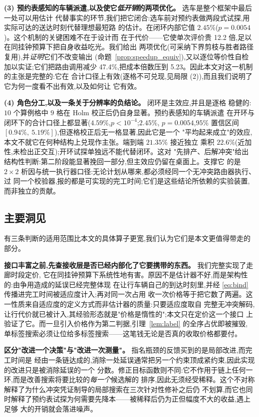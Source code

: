 \documentclass[manuscript,screen,review]{acmart}
\newcommand{\NCases}{10}
\newcommand{\GainProbeOpen}{4.59\%}      %
\newcommand{\PProbeOpen}{<10^{-4}}
\newcommand{\GainProbeLoop}{2.45\%}      %
\newcommand{\PProbeLoop}{=0.0054}
\newcommand{\GainEndToEnd}{21.35\%}      %
\newcommand{\CIProbeLoop}{$[0.94\%,\ 5.19\%]$}
\newcommand{\GainIndepProduct}{22.6\%}
\newcommand{\CellsSigLoopAdj}{9}
\newcommand{\RouteCallCut}{47.4\%}
\newcommand{\CostMultBefore}{12.2}
\newcommand{\CostMultAfter}{5.23}
\begin{document}
\textbf{(3) 预约表感知的车辆派遣,以及使它\emph{低开销}的两项优化。} 选车是整个框架中最后一处可以用估计
代替事实的环节,我们把它闭合:选车前对预约表做两段式试探,用实际可达的送达时刻代替理想最短路
的估计。在闭环内部它值 $\GainProbeLoop$($p\PProbeLoop$)。这个机制的关键困难不在于设计而
在于代价——它使单次评价贵 \CostMultBefore{} 倍,足以在同挂钟预算下把自身收益吃光。我们给出
两项优化(可采纳下界剪枝与胜者路径复用),并\emph{证明}它们不改变输出
(命题~\ref{prop:speedup_equiv}),又以逐位等价性自检加以实证;它们把路由调用减少
\RouteCallCut{},把成本倍数压到 \CostMultAfter{}。因此本文对这一机制的主张是完整的:它在
合计口径上有效(逐格不可兑现,见局限 (2)),而且我们说明了它为何一度看不出有效,以及如何让
它有效。

\textbf{(4) 角色分工,以及一条关于分辨率的负结论。} 闭环是主效应,并且是逐格
稳健的:$\NCases$ 个算例格中 $\CellsSigLoopAdj$ 格在 Holm 校正后仍自身显著。预约表感知的车辆派遣
在开环与闭环下的合计口径上都显著($\GainProbeOpen$,$p\PProbeOpen$;$\GainProbeLoop$,
$p\PProbeLoop$,$95\%$ 置信区间 \CIProbeLoop{}),但逐格校正后无一格显著,因此它是一个
"平均起来成立"的效应,本文不就它在何种结构上兑现作主张。端到端 $\GainEndToEnd$ 接近独立
乘积 $\GainIndepProduct$(近加性,未检出正交互);开环试探单独远不能代替闭环。这对
"先排产、后解冲突"给出结构性判断:第二阶段能显著挽回一部分,但主效应仍留在桌面上。支撑它
的是 $2\times 2$ 析因与统一执行器口径:无论计划从哪来,都必须经同一个无冲突路由器执行、过
同一个校验器,报的都是可实现的完工时间;它们是这些结论所依赖的实验装置,而非独立的贡献。

\subsection{主要洞见}
\label{sec:insights}

有三条判断的适用范围比本文的具体算子更宽,我们认为它们是本文更值得带走的部分。

\textbf{接口丰富之前,先查接收层是否已经内部化了它要携带的东西。} 我们完整实现了走廊时段定价,
它在同挂钟预算下系统性地有害。原因不是估计器不好,而是架构性的:由争用造成的延误已经完整体现
在让行车辆自己的到达时刻里,并经 \eqref{eq:bind} 传播进完工时间被适应度计入;再对同一次占用
收一次价格等于把它数了两遍。这一性质来自适应度的定义方式而非估计器的质量:只要适应度取自
完整无冲突解码,让行代价就已被计入,其经验形态就是"价格是惰性的";本文只在定价这一个接口
上验证了它。而一旦引入价格作为第二判据,引理~\ref{lem:label} 的全序占优即被摧毁,
单标签搜索必须让位给多标签搜索——这笔钱无论是否真的收取价格都要付。

\textbf{区分"改进一个决策"与"改进一次测量"。} 指名瓶颈的反馈买到的是局部改进,而完工时间是
经由一条链达成的,消除一处延误通常把另一个约束顶成紧约束,因此实现的改进只是被消除延误的一个
分数。修正目标函数则不同:它不作用于链上任何一环,而是改善搜索将要比较的\emph{每一个}候选解的
排序,因此无须经受稀释。这个不对称解释了为什么冲突凭证制导的局部搜索在三次针对性修补之后仍
不划算,而它也同时解释了预约表试探为何需要先降本——被稀释后仍为正但幅度不大的收益,遇上足够
大的开销就会落进噪声。
\end{document}
